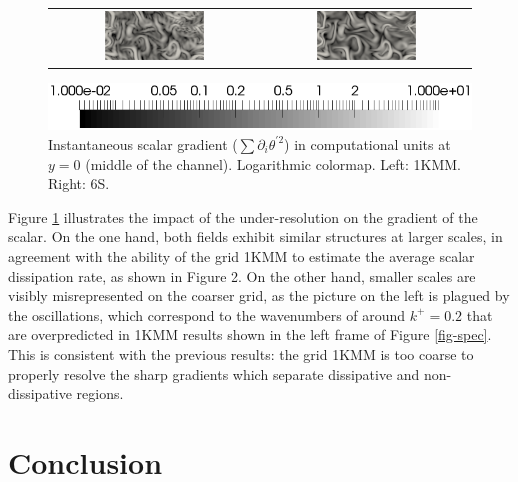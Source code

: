 \documentclass[review]{elsarticle}
\begin{document}
\begin{figure}[htbp]
\begin{center}
\begin{tabular}{cc}
\includegraphics[width=0.5\textwidth]{../visu/diss1KMM.png} & 
\includegraphics[width=0.5\textwidth]{../visu/diss6S.png}
\end{tabular}
\includegraphics[width=\textwidth]{../visu/diss_colorbar.png}
\end{center}
\caption{Instantaneous scalar gradient ($\sum \partial_i \theta^{\prime 2}$) in {\color{red} computational} units at $y=0$ (middle of the channel). Logarithmic colormap. Left: 1KMM. Right: 6S.}
\label{fig-visu}
\end{figure}

Figure \ref{fig-visu} illustrates the impact of the under-resolution on the gradient of the scalar. On the one hand, both fields exhibit similar structures at larger scales, in agreement with the ability of the grid 1KMM to estimate the average {\color{red}scalar} dissipation rate, as shown in Figure 2. On the other hand, smaller scales are visibly misrepresented on the coarser grid, as the picture on the left is plagued by the oscillations, which correspond to the wavenumbers of around $k^+=0.2$ that are overpredicted in 1KMM results shown in {\color{red}the left frame of} Figure \ref{fig-spec}. This is consistent with the previous results: the grid 1KMM is too coarse to properly resolve the sharp gradients which separate dissipative and non-dissipative regions.

\section{Conclusion}
\end{document}
